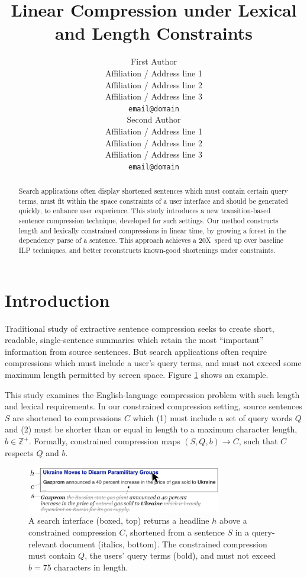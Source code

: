 \documentclass[11pt,a4paper]{article}
\title{Linear Compression under Lexical and Length Constraints}
\author{First Author \\
  Affiliation / Address line 1 \\
  Affiliation / Address line 2 \\
  Affiliation / Address line 3 \\
  {\tt email@domain} \\\And
  Second Author \\
  Affiliation / Address line 1 \\
  Affiliation / Address line 2 \\
  Affiliation / Address line 3 \\
  {\tt email@domain} \\}
\date{}
\newcommand{\speedup}[0]{20X~}
\begin{document}
\maketitle

\begin{abstract}
Search applications often display shortened sentences which must contain certain query terms, must fit within the space constraints of a user interface and should be generated quickly, to enhance user experience. This study introduces a new transition-based sentence compression technique, developed for such settings. Our method constructs length and lexically constrained compressions in linear time, by growing a forest in the dependency parse of a sentence. This approach achieves a \speedup speed up over baseline ILP techniques, and better reconstructs known-good shortenings under constraints.
\end{abstract}


\section{Introduction}\label{s:intro}

Traditional study of extractive sentence compression seeks to create short, readable, single-sentence summaries which retain the most ``important'' information from source sentences. But search applications often require compressions which must include a user's query terms, and must not exceed some maximum length permitted by screen space.  Figure \ref{f:qf} shows an example.

This study examines the English-language compression problem with such length and lexical requirements. In our constrained compression setting, source sentences $S$ are shortened to compressions $C$ which (1) must include a set of query words $Q$ and (2) must be shorter than or equal in length to a maximum character length, $b \in \mathbb{Z}^{+}$. Formally, constrained compression maps $(S,Q,b) \rightarrow C$, such that $C$ respects $Q$ and $b$.

\begin{figure}[htb!]
\includegraphics[width=8.5cm]{qf.pdf}
\caption{A search interface (boxed, top) returns a headline $h$ above a constrained compression $C$, shortened from a sentence $S$ in a query-relevant document (italics, bottom). The constrained compression must contain $Q$, the users' query terms (bold), and must not exceed $b=$75 characters in length.}
\label{f:qf}
\end{figure}
\end{document}
